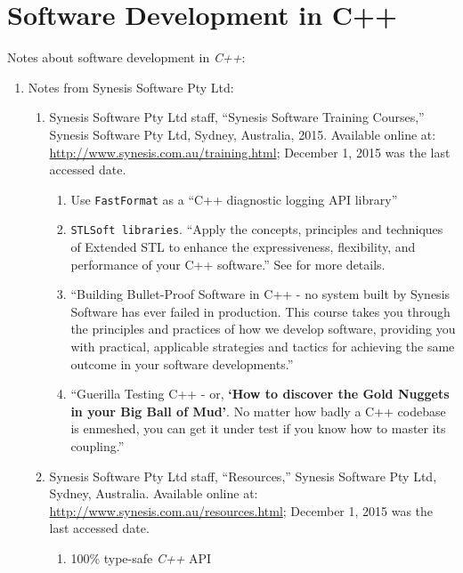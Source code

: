 \section{Software Development in C++}
\label{sec:SoftwareDevelopmentInCpp}


Notes about software development in {\it C++}: \vspace{-0.3cm}
\begin{enumerate} \itemsep -4pt
\item Notes from Synesis Software Pty Ltd: \vspace{-0.3cm}
	\begin{enumerate} \itemsep -2pt
	\item Synesis Software Pty Ltd staff, ``Synesis Software Training Courses,'' Synesis Software Pty Ltd, Sydney, Australia, 2015.  Available online at: \url{http://www.synesis.com.au/training.html}; December 1, 2015 was the last accessed date. \vspace{-0.2cm}
		\begin{enumerate} \itemsep -2pt
		\item Use {\tt FastFormat} as a ``C++ diagnostic logging API library''
		\item {\tt STLSoft libraries}. ``Apply the concepts, principles and techniques of Extended STL to enhance the expressiveness, flexibility, and performance of your C++ software.'' See \cite{Wilson2007} for more details.
		\item ``Building Bullet-Proof Software in C++ - no system built by Synesis Software has ever failed in production. This course takes you through the principles and practices of how we develop software, providing you with practical, applicable strategies and tactics for achieving the same outcome in your software developments.''
		\item ``Guerilla Testing C++ - or, {\bf \large `How to discover the Gold Nuggets in your Big Ball of Mud'}. No matter how badly a C++ codebase is enmeshed, you can get it under test if you know how to master its coupling.''
		\end{enumerate}
	\item Synesis Software Pty Ltd staff, ``Resources,'' Synesis Software Pty Ltd, Sydney, Australia.  Available online at: \url{http://www.synesis.com.au/resources.html}; December 1, 2015 was the last accessed date. \vspace{-0.2cm}
		\begin{enumerate} \itemsep -2pt
		\item 100\% type-safe {\it C++} API

\end{enumerate}
\end{enumerate}
\end{enumerate}
